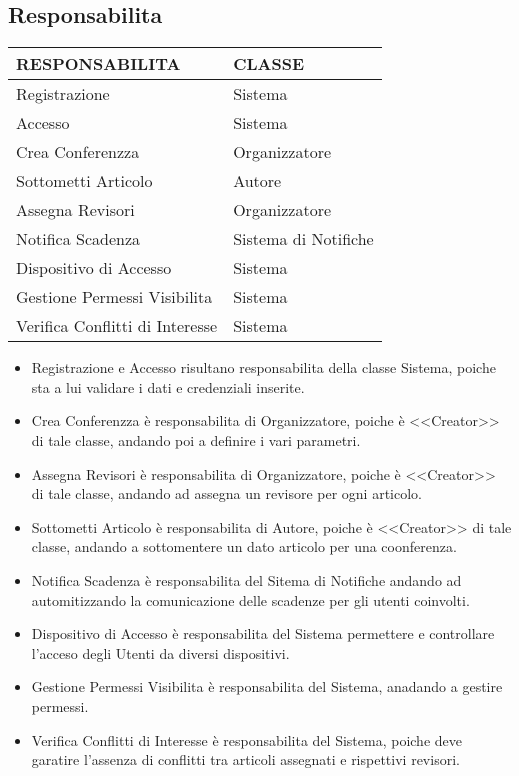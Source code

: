 \subsection{Responsabilita}
\label{sec:responsabilita}
\begin{tabular}{|p{5cm}|p{5cm}|}
\hline 
 \rowcolor{SkyBlue}
RESPONSABILITA & CLASSE\\
\hline
Registrazione & Sistema\\
\hline
Accesso & Sistema\\
\hline
Crea Conferenzza & Organizzatore\\
\hline
Sottometti Articolo & Autore\\
\hline
Assegna Revisori & Organizzatore\\
\hline
Notifica Scadenza & Sistema di Notifiche\\
\hline
Dispositivo di Accesso & Sistema\\
\hline
Gestione Permessi Visibilita & Sistema\\
\hline
Verifica Conflitti di Interesse & Sistema\\
\hline
\end{tabular}

\begin{itemize}
\item Registrazione e Accesso risultano responsabilita della classe Sistema, poiche sta a lui validare i dati e credenziali inserite.\\
\item Crea Conferenzza è responsabilita di Organizzatore, poiche è <<Creator>> di tale classe, andando poi a definire i vari parametri.\\
\item Assegna Revisori è responsabilita di Organizzatore, poiche è <<Creator>> di tale classe, andando ad assegna un revisore per ogni articolo.\\
\item Sottometti Articolo è responsabilita di Autore, poiche è <<Creator>> di tale classe, andando a sottomentere un dato articolo per una coonferenza.\\
\item Notifica Scadenza è responsabilita del Sitema di Notifiche andando ad automitizzando la comunicazione delle scadenze per gli utenti coinvolti.\\
\item Dispositivo di Accesso è responsabilita del Sistema permettere e controllare l'acceso degli Utenti da diversi dispositivi.\\
\item Gestione Permessi Visibilita è responsabilita del Sistema, anadando a gestire permessi.\\
\item Verifica Conflitti di Interesse è responsabilita del Sistema, poiche deve garatire l'assenza di conflitti tra articoli assegnati e rispettivi revisori.\\
\end{itemize}

